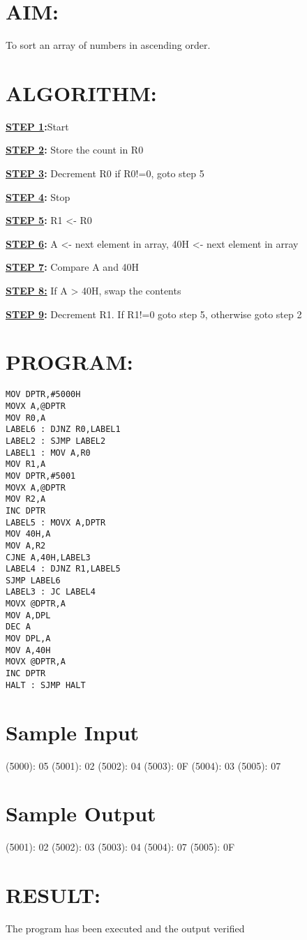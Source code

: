 
%
%
%
%
\section*{AIM:}
To sort an array of numbers in ascending order.

\section*{ALGORITHM:}
\textbf{\underline{STEP 1}:}Start

\textbf{\underline{STEP 2}:} Store the count in R0

\textbf{\underline{STEP 3}:} Decrement R0 if R0!=0, goto step 5

\textbf{\underline{STEP 4}:} Stop

\textbf{\underline{STEP 5}:} R1 <- R0 

\textbf{\underline{STEP 6}:} A <- next element in array, 40H <- next element in array

\textbf{\underline{STEP 7}:} Compare A and 40H

\textbf{\underline{STEP 8:}} If A > 40H, swap the contents

\textbf{\underline{STEP 9}:} Decrement R1. If R1!=0 goto step 5, otherwise goto step 2


\section*{PROGRAM:}

\begin{lstlisting}
MOV DPTR,#5000H
MOVX A,@DPTR
MOV R0,A 
LABEL6 : DJNZ R0,LABEL1
LABEL2 : SJMP LABEL2
LABEL1 : MOV A,R0
MOV R1,A
MOV DPTR,#5001
MOVX A,@DPTR
MOV R2,A
INC DPTR
LABEL5 : MOVX A,DPTR
MOV 40H,A
MOV A,R2
CJNE A,40H,LABEL3
LABEL4 : DJNZ R1,LABEL5
SJMP LABEL6
LABEL3 : JC LABEL4
MOVX @DPTR,A
MOV A,DPL
DEC A
MOV DPL,A
MOV A,40H
MOVX @DPTR,A
INC DPTR
HALT : SJMP HALT 
\end{lstlisting}

\section*{Sample Input}
(5000): 05
(5001): 02
(5002): 04
(5003): 0F
(5004): 03
(5005): 07

\section*{Sample Output}
(5001): 02 
(5002): 03 
(5003): 04
(5004): 07
(5005): 0F

\section*{RESULT:}
The program has been executed and the output verified
%
%
%
%
